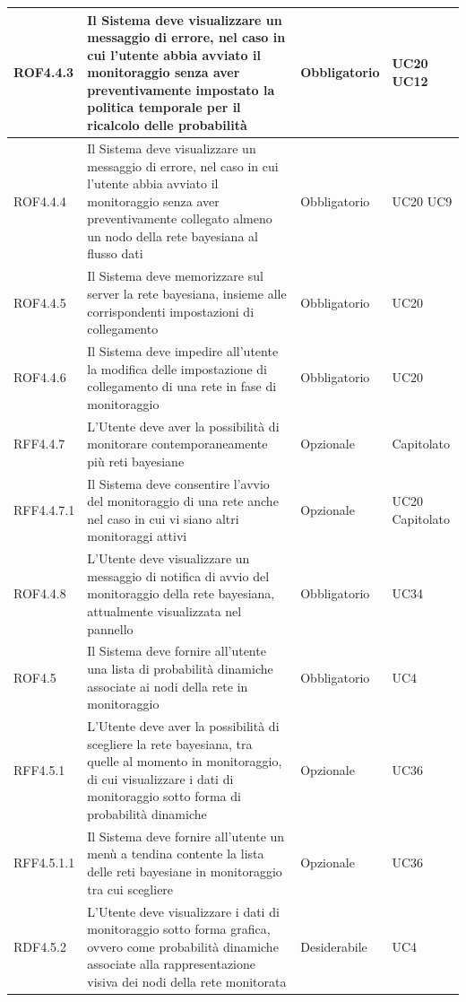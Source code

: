 \begin{center}
\begin{longtable}[c]{|m{}|m{}|m{}|m{}|}
\hline
\rowcolor{grigio}ROF4.4.3 & Il Sistema deve visualizzare un messaggio di errore, nel caso in cui l'utente abbia avviato il monitoraggio senza aver preventivamente impostato la politica temporale per il ricalcolo delle probabilità & Obbligatorio & UC20 UC12\\
\hline
ROF4.4.4 & Il Sistema deve visualizzare un messaggio di errore, nel caso in cui l'utente abbia avviato il monitoraggio senza aver preventivamente collegato almeno un nodo della rete bayesiana al flusso dati & Obbligatorio & UC20 UC9\\
\hline
\rowcolor{grigio}ROF4.4.5 & Il Sistema deve memorizzare sul server la rete bayesiana, insieme alle corrispondenti impostazioni di collegamento & Obbligatorio & UC20\\
\hline
ROF4.4.6 & Il Sistema deve impedire all'utente la modifica delle impostazione di collegamento di una rete in fase di monitoraggio & Obbligatorio & UC20\\
\hline
\rowcolor{grigio}RFF4.4.7 & L'Utente deve aver la possibilità di monitorare contemporaneamente più reti bayesiane & Opzionale & Capitolato\\
\hline
RFF4.4.7.1 & Il Sistema deve consentire l'avvio del monitoraggio di una rete anche nel caso in cui vi siano altri monitoraggi attivi & Opzionale & UC20 Capitolato\\
\hline
\rowcolor{grigio}ROF4.4.8 & L'Utente deve visualizzare un messaggio di notifica di avvio del monitoraggio della rete bayesiana, attualmente visualizzata nel pannello & Obbligatorio & UC34\\
\hline
ROF4.5 & Il Sistema deve fornire all'utente una lista di probabilità dinamiche associate ai nodi della rete in monitoraggio & Obbligatorio & UC4\\
\hline
\rowcolor{grigio}RFF4.5.1 & L'Utente deve aver la possibilità di scegliere la rete bayesiana, tra quelle al momento in monitoraggio, di cui visualizzare i dati di monitoraggio sotto forma di probabilità dinamiche & Opzionale & UC36\\
\hline
RFF4.5.1.1 & Il Sistema deve fornire all'utente un menù a tendina contente la lista delle reti bayesiane in monitoraggio tra cui scegliere & Opzionale & UC36\\
\hline
\rowcolor{grigio}RDF4.5.2 & L'Utente deve visualizzare i dati di monitoraggio sotto forma grafica, ovvero come probabilità dinamiche associate alla rappresentazione visiva dei nodi della rete monitorata & Desiderabile & UC4\\
\hline

\end{longtable}
\end{center}
